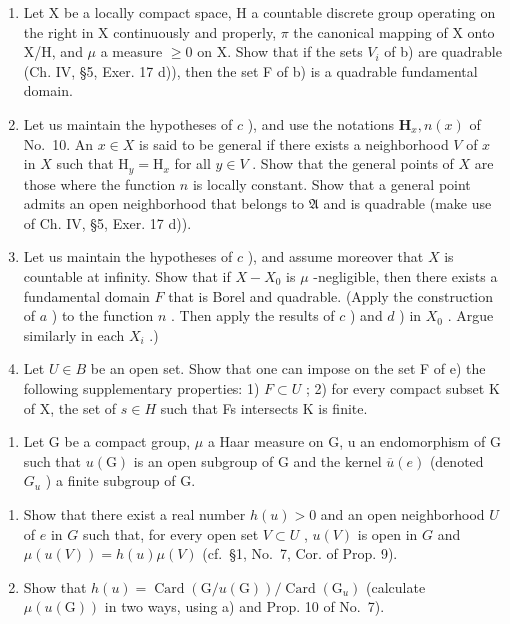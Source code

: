\begin{enumerate}
\def\labelenumi{\alph{enumi})}
\setcounter{enumi}{2}
\item
  Let X be a locally compact space, H a countable discrete group operating on the right in X continuously and properly, \(\pi\) the canonical mapping of X onto X/H, and \(\mu\) a measure \(\geqslant 0\) on X. Show that if the sets \(V_{i}\) of b) are quadrable (Ch. IV, §5, Exer. 17 d)), then the set F of b) is a quadrable fundamental domain.
\item
  Let us maintain the hypotheses of \(c\) ), and use the notations \(\mathbf{H}_x, n(x)\) of No.~10. An \(x \in X\) is said to be general if there exists a neighborhood \(V\) of \(x\) in \(X\) such that \(\mathrm{H}_y = \mathrm{H}_x\) for all \(y \in V\) . Show that the general points of \(X\) are those where the function \(n\) is locally constant. Show that a general point admits an open neighborhood that belongs to \(\mathfrak{A}\) and is quadrable (make use of Ch. IV, §5, Exer. 17 d)).
\item
  Let us maintain the hypotheses of \(c\) ), and assume moreover that \(X\) is countable at infinity. Show that if \(X - X_0\) is \(\mu\) -negligible, then there exists a fundamental domain \(F\) that is Borel and quadrable. (Apply the construction of \(a\) ) to the function \(n\) . Then apply the results of \(c\) ) and \(d\) ) in \(X_0\) . Argue similarly in each \(X_i\) .)
\item
  Let \(U \in B\) be an open set. Show that one can impose on the set F of e) the following supplementary properties: 1) \(F \subset U\) ; 2) for every compact subset K of X, the set of \(s \in H\) such that Fs intersects K is finite.
\end{enumerate}

\begin{enumerate}
\def\labelenumi{\arabic{enumi})}
\setcounter{enumi}{12}
\tightlist
\item
  Let G be a compact group, \(\mu\) a Haar measure on G, u an endomorphism of G such that \(u(\mathrm{G})\) is an open subgroup of G and the kernel \(\overline{u}(e)\) (denoted \(G_{u}\) ) a finite subgroup of G.
\end{enumerate}

\begin{enumerate}
\def\labelenumi{\alph{enumi})}
\item
  Show that there exist a real number \(h(u) > 0\) and an open neighborhood \(U\) of \(e\) in \(G\) such that, for every open set \(V \subset U\) , \(u(V)\) is open in \(G\) and \(\mu(u(V)) = h(u)\mu(V)\) (cf.~§1, No.~7, Cor. of Prop. 9).
\item
  Show that \(h(u) = \operatorname{Card}(\mathrm{G} / u(\mathrm{G})) / \operatorname{Card}(\mathrm{G}_u)\) (calculate \(\mu(u(\mathrm{G}))\) in two ways, using a) and Prop. 10 of No.~7).
\end{enumerate}

